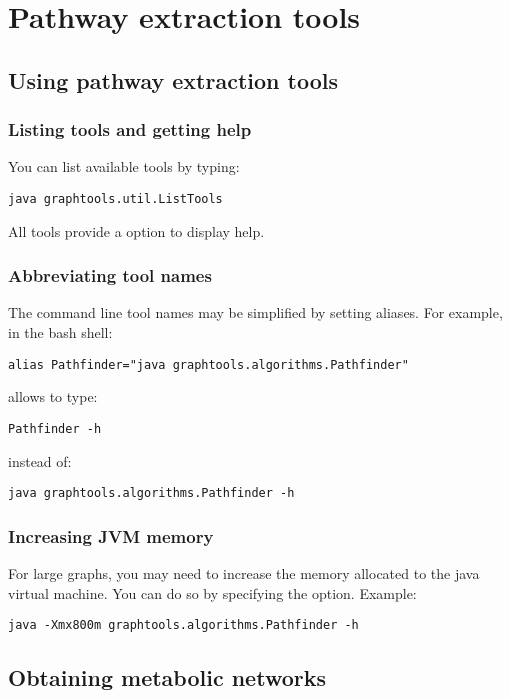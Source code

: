 \chapter{Pathway extraction tools}

\section{Using pathway extraction tools}

\subsection{Listing tools and getting help}
You can list available tools by typing:

\begin{verbatim}
java graphtools.util.ListTools
\end{verbatim}

All tools provide a  option to display help.

\subsection{Abbreviating tool names}
The command line tool names may be simplified by setting aliases.
For example, in the bash shell:
\begin{verbatim}
alias Pathfinder="java graphtools.algorithms.Pathfinder"
\end{verbatim}
allows to type:
\begin{verbatim}
Pathfinder -h
\end{verbatim}
instead of:
\begin{verbatim}
java graphtools.algorithms.Pathfinder -h
\end{verbatim}

\subsection{Increasing JVM memory}
For large graphs, you may need to increase the memory allocated to the java virtual machine.
You can do so by specifying the  option.
Example:
\begin{verbatim}
java -Xmx800m graphtools.algorithms.Pathfinder -h
\end{verbatim}

\section{Obtaining metabolic networks}

